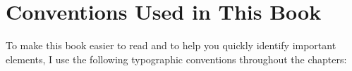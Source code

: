 
%
%

\section{Conventions Used in This Book}
\label{intro} %

To make this book easier to read and to help you quickly identify important elements, I use the following typographic conventions throughout the chapters:

